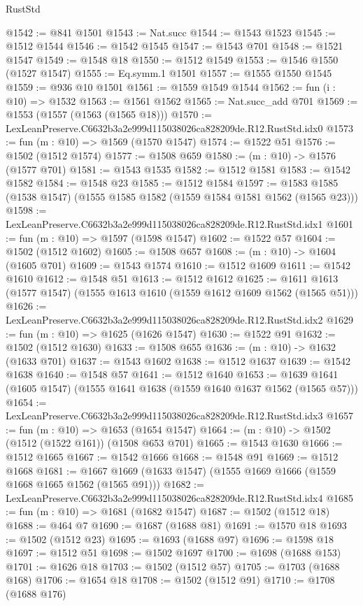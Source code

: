 \begin{lexlean}{RustStd}
\begin{coremodule}
@1542 := @841 @1501
@1543 := Nat.succ
@1544 := @1543 @1523
@1545 := @1512 @1544
@1546 := @1542 @1545
@1547 := @1543 @701
@1548 := @1521 @1547
@1549 := @1548 @18
@1550 := @1512 @1549
@1553 := @1546 @1550 (@1527 @1547)
@1555 := Eq.symm.{1} @1501
@1557 := @1555 @1550 @1545
@1559 := @936 @10 @1501
@1561 := @1559 @1549 @1544
@1562 := fun (i : @10) => @1532
@1563 := @1561 @1562
@1565 := Nat.succ_add @701
@1569 := @1553 (@1557 (@1563 (@1565 @18)))
@1570 := LexLeanPreserve.C6632b3a2e999d115038026ca828209de.R12.RustStd.idx0
@1573 := fun (m : @10) => @1569 (@1570 @1547)
@1574 := @1522 @51
@1576 := @1502 (@1512 @1574)
@1577 := @1508 @659
@1580 := (m : @10) -> @1576 (@1577 @701)
@1581 := @1543 @1535
@1582 := @1512 @1581
@1583 := @1542 @1582
@1584 := @1548 @23
@1585 := @1512 @1584
@1597 := @1583 @1585 (@1538 @1547) (@1555 @1585 @1582 (@1559 @1584 @1581 @1562 (@1565 @23)))
@1598 := LexLeanPreserve.C6632b3a2e999d115038026ca828209de.R12.RustStd.idx1
@1601 := fun (m : @10) => @1597 (@1598 @1547)
@1602 := @1522 @57
@1604 := @1502 (@1512 @1602)
@1605 := @1508 @657
@1608 := (m : @10) -> @1604 (@1605 @701)
@1609 := @1543 @1574
@1610 := @1512 @1609
@1611 := @1542 @1610
@1612 := @1548 @51
@1613 := @1512 @1612
@1625 := @1611 @1613 (@1577 @1547) (@1555 @1613 @1610 (@1559 @1612 @1609 @1562 (@1565 @51)))
@1626 := LexLeanPreserve.C6632b3a2e999d115038026ca828209de.R12.RustStd.idx2
@1629 := fun (m : @10) => @1625 (@1626 @1547)
@1630 := @1522 @91
@1632 := @1502 (@1512 @1630)
@1633 := @1508 @655
@1636 := (m : @10) -> @1632 (@1633 @701)
@1637 := @1543 @1602
@1638 := @1512 @1637
@1639 := @1542 @1638
@1640 := @1548 @57
@1641 := @1512 @1640
@1653 := @1639 @1641 (@1605 @1547) (@1555 @1641 @1638 (@1559 @1640 @1637 @1562 (@1565 @57)))
@1654 := LexLeanPreserve.C6632b3a2e999d115038026ca828209de.R12.RustStd.idx3
@1657 := fun (m : @10) => @1653 (@1654 @1547)
@1664 := (m : @10) -> @1502 (@1512 (@1522 @161)) (@1508 @653 @701)
@1665 := @1543 @1630
@1666 := @1512 @1665
@1667 := @1542 @1666
@1668 := @1548 @91
@1669 := @1512 @1668
@1681 := @1667 @1669 (@1633 @1547) (@1555 @1669 @1666 (@1559 @1668 @1665 @1562 (@1565 @91)))
@1682 := LexLeanPreserve.C6632b3a2e999d115038026ca828209de.R12.RustStd.idx4
@1685 := fun (m : @10) => @1681 (@1682 @1547)
@1687 := @1502 (@1512 @18)
@1688 := @464 @7
@1690 := @1687 (@1688 @81)
@1691 := @1570 @18
@1693 := @1502 (@1512 @23)
@1695 := @1693 (@1688 @97)
@1696 := @1598 @18
@1697 := @1512 @51
@1698 := @1502 @1697
@1700 := @1698 (@1688 @153)
@1701 := @1626 @18
@1703 := @1502 (@1512 @57)
@1705 := @1703 (@1688 @168)
@1706 := @1654 @18
@1708 := @1502 (@1512 @91)
@1710 := @1708 (@1688 @176)

\end{coremodule}
\end{lexlean}
